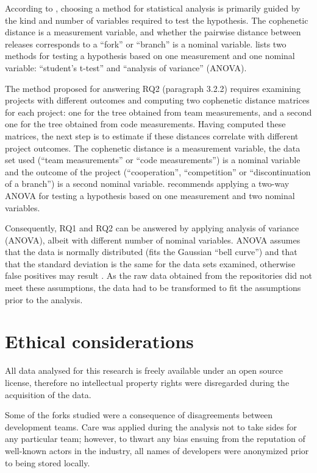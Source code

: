 According to \citet{McDonald2014b}, choosing a method for statistical analysis is primarily guided by the kind and number of variables required to test the hypothesis. The cophenetic distance is a measurement variable, and whether the pairwise distance between releases corresponds to a “fork” or “branch” is a nominal variable. \citet{McDonald2014b} lists two methods for testing a hypothesis based on one measurement and one nominal variable: “student's t-test” and “analysis of variance” (ANOVA).

The method proposed for answering RQ2 (paragraph 3.2.2) requires examining projects with different outcomes and computing two cophenetic distance matrices for each project: one for the tree obtained from team measurements, and a second one for the tree obtained from code measurements. Having computed these matrices, the next step is to estimate if these distances correlate with different project outcomes. The cophenetic distance is a measurement variable, the data set used (“team measurements” or “code measurements”) is a nominal variable and the outcome of the project (“cooperation”, “competition” or “discontinuation of a branch”) is a second nominal variable. \citet{McDonald2014b} recommends applying a two-way ANOVA for testing a hypothesis based on one measurement and two nominal variables.

Consequently, RQ1 and RQ2 can be answered by applying analysis of variance (ANOVA), albeit with different number of nominal variables. ANOVA assumes that the data is normally distributed (fits the Gaussian “bell curve”) and that that the standard deviation is the same for the data sets examined, otherwise false positives may result \citep[p.147]{McDonald2014b}. As the raw data obtained from the repositories did not meet these assumptions, the data had to be transformed to fit the assumptions prior to the analysis.

\section{Ethical considerations}
All data analysed for this research is freely available under an open source license, therefore no intellectual property rights were disregarded during the acquisition of the data. 

Some of the forks studied were a consequence of disagreements between development teams. Care was applied during the analysis not to take sides for any particular team; however, to thwart any bias ensuing from the reputation of well-known actors in the industry, all names of developers were anonymized prior to being stored locally.

